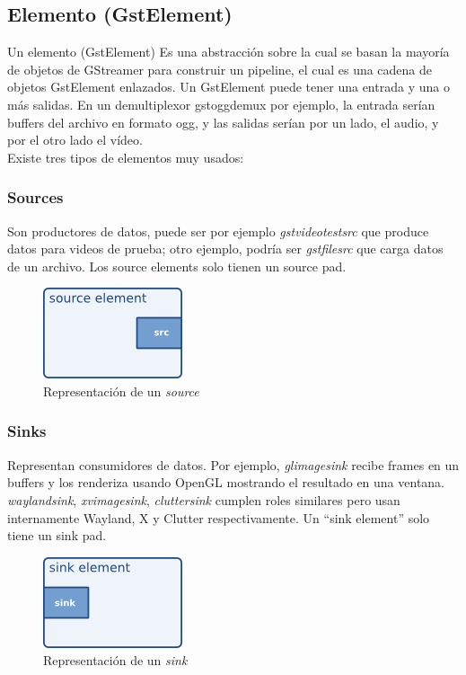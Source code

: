 \documentclass[a4paper,openright,12pt]{report}
\begin{document}
\subsection{Elemento (GstElement)}
Un elemento (GstElement) Es una abstracción sobre la cual se basan la mayoría de
objetos de GStreamer para construir un pipeline, el cual es una cadena de
objetos GstElement enlazados. Un GstElement puede tener una entrada y una o más
salidas. En un demultiplexor gstoggdemux por ejemplo, la entrada serían buffers
del archivo en formato ogg, y las salidas serían por un lado, el audio, y por
el otro lado el vídeo.\\
Existe tres tipos de elementos muy usados:\\
\subsubsection{Sources}
Son productores de datos, puede ser por ejemplo \textit{gstvideotestsrc} que
produce datos para videos de prueba; otro ejemplo, podría ser
\textit{gstfilesrc} que carga datos de un archivo. Los source elements solo
tienen un source pad.

\begin{figure}[h]
  \centering
    \includegraphics{../images/pwg-src-element.png}\par
  \caption{Representación de un \textit{source}}
\end{figure}

\subsubsection{Sinks}
Representan consumidores de datos. Por ejemplo, \textit{glimagesink} recibe
frames en un buffers y los renderiza usando OpenGL mostrando el resultado en una
ventana. \textit{waylandsink}, \textit{xvimagesink}, \textit{cluttersink}
cumplen roles similares pero usan internamente Wayland, X y Clutter
respectivamente. Un ``sink element'' solo tiene un sink pad.

\begin{figure}[h]
  \centering
    \includegraphics{../images/pwg-sink-element.png}\par
  \caption{Representación de un \textit{sink}}
\end{figure}
\end{document}
